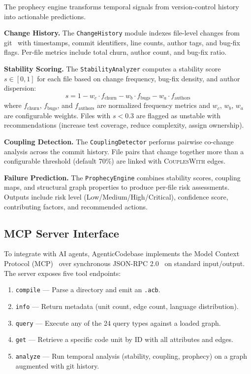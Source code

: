\documentclass[10pt, twocolumn]{article}
\newcommand{\acbfile}{\texttt{.acb}\xspace}
\begin{document}
The prophecy engine transforms temporal signals from version-control history into actionable predictions.

\textbf{Change History.} The \texttt{ChangeHistory} module indexes file-level changes from git~\cite{git2005} with timestamps, commit identifiers, line counts, author tags, and bug-fix flags. Per-file metrics include total churn, author count, and bug-fix ratio.

\textbf{Stability Scoring.} The \texttt{StabilityAnalyzer} computes a stability score $s \in [0, 1]$ for each file based on change frequency, bug-fix density, and author dispersion:
\begin{equation}
s = 1 - w_c \cdot f_{\text{churn}} - w_b \cdot f_{\text{bugs}} - w_a \cdot f_{\text{authors}}
\end{equation}
where $f_{\text{churn}}$, $f_{\text{bugs}}$, and $f_{\text{authors}}$ are normalized frequency metrics and $w_c$, $w_b$, $w_a$ are configurable weights. Files with $s < 0.3$ are flagged as unstable with recommendations (increase test coverage, reduce complexity, assign ownership).

\textbf{Coupling Detection.} The \texttt{CouplingDetector} performs pairwise co-change analysis across the commit history. File pairs that change together more than a configurable threshold (default 70\%) are linked with \textsc{CouplesWith} edges.

\textbf{Failure Prediction.} The \texttt{ProphecyEngine} combines stability scores, coupling maps, and structural graph properties to produce per-file risk assessments. Outputs include risk level (Low/Medium/High/Critical), confidence score, contributing factors, and recommended actions.


\subsection{MCP Server Interface}
\label{sec:mcp}

To integrate with AI agents, AgenticCodebase implements the Model Context Protocol (MCP)~\cite{mcp2024} over synchronous JSON-RPC 2.0~\cite{jsonrpc2013} on standard input/output. The server exposes five tool endpoints:

\begin{enumerate}[leftmargin=*, itemsep=1pt]
\item \texttt{compile} --- Parse a directory and emit an \acbfile.
\item \texttt{info} --- Return metadata (unit count, edge count, language distribution).
\item \texttt{query} --- Execute any of the 24 query types against a loaded graph.
\item \texttt{get} --- Retrieve a specific code unit by ID with all attributes and edges.
\item \texttt{analyze} --- Run temporal analysis (stability, coupling, prophecy) on a graph augmented with git history.
\end{enumerate}
\end{document}
